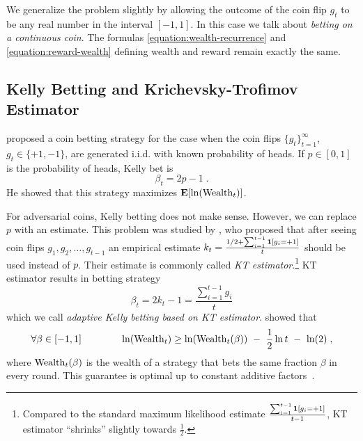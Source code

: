 We generalize the problem slightly by allowing the outcome of the coin flip
$g_t$ to be any real number in the interval $[-1,1]$. In this case we talk about
\emph{betting on a continuous coin}. The formulas
\eqref{equation:wealth-recurrence} and \eqref{equation:reward-wealth} defining
wealth and reward remain exactly the same.

\subsection{Kelly Betting and Krichevsky-Trofimov Estimator}

\citet{Kelly56} proposed a coin betting strategy for the case when the coin
flips $\{g_t\}_{t=1}^\infty$, $g_t \in \{+1,-1\}$, are generated i.i.d. with
known probability of heads. If $p \in [0,1]$ is the probability of heads, Kelly
bet is
$$
\beta_t = 2p - 1 \; .
$$
He showed that this strategy maximizes $\operatorname*{\mathbf{E}}[\ln(\operatorname{Wealth}_t)]$.

For adversarial coins, Kelly betting does not make sense. However, we can
replace $p$ with an estimate. This problem was studied by \citet{KrichevskyT81},
who proposed that after seeing coin flips $g_1, g_2, \dots, g_{t-1}$ an
empirical estimate $k_t = \frac{1/2 + \sum_{i=1}^{t-1} \mathbf{1}[g_i = +1]}{t}$
should be used instead of $p$. Their estimate is commonly called \emph{KT
estimator}.\footnote{Compared to the standard maximum likelihood estimate
$\frac{\sum_{i=1}^{t-1} \mathbf{1}[g_i = +1]}{t-1}$, KT estimator ``shrinks''
slightly towards $\frac{1}{2}$.} KT estimator results in betting strategy
\begin{equation}
\label{equation:kt-estimator-betting-strategy}
\beta_t = 2k_t - 1 = \frac{\sum_{i=1}^{t-1} g_i}{t}
\end{equation}
which we call \emph{adaptive Kelly betting based on KT estimator}.
\citeauthor{KrichevskyT81} showed that
$$
\forall \beta \in [-1,1] \qquad \qquad \ln(\Wealth_t) \ge \ln(\Wealth_t(\beta)) \ - \ \frac{1}{2} \ln t \ - \ \ln(2) \; ,
$$
where $\operatorname{Wealth}_t(\beta)$ is the wealth of a strategy that bets the same fraction
$\beta$ in every round. This guarantee is optimal up to constant additive factors~\citep{Cesa-BianchiL06}.
